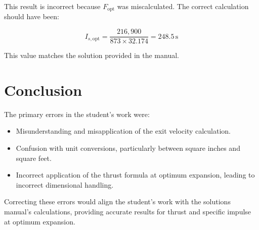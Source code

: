 \documentclass{article}
\begin{document}
This result is incorrect because \( F_{\text{opt}} \) was miscalculated. The correct calculation should have been:

\begin{equation}
I_{s,\text{opt}} = \frac{216,900}{873 \times 32.174} = 248.5 \, \text{s}
\end{equation}

This value matches the solution provided in the manual.

\section{Conclusion}

The primary errors in the student's work were:
\begin{itemize}
    \item Misunderstanding and misapplication of the exit velocity calculation.
    \item Confusion with unit conversions, particularly between square inches and square feet.
    \item Incorrect application of the thrust formula at optimum expansion, leading to incorrect dimensional handling.
\end{itemize}

Correcting these errors would align the student's work with the solutions manual's calculations, providing accurate results for thrust and specific impulse at optimum expansion.
\end{document}
